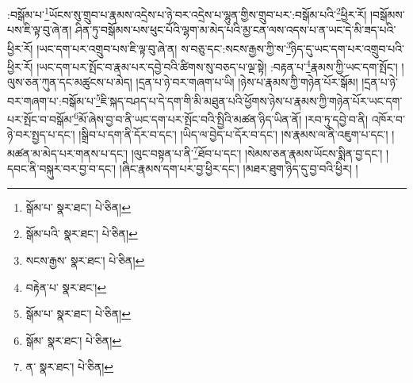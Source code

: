 :བསྒོམ་པ་\footnote{སྒོམ་པ་  སྣར་ཐང་།  པེ་ཅིན། }ཡོངས་སུ་གྲུབ་པ་རྣམས་འདྲེས་པ་ཉེ་བར་འདྲེས་པ་ལྷུན་གྱིས་གྲུབ་པར་:བསྒོམ་པའི་\footnote{སྒོམ་པའི་  སྣར་ཐང་།  པེ་ཅིན། }ཕྱིར་རོ། །བསྒོམས་པས་ཇི་ལྟ་བུ་ཞེ་ན། ཤིན་ཏུ་བསྒོམས་པས་ཕུང་པོའི་ལྷག་མ་མེད་པའི་མྱ་ངན་ལས་འདས་པ་ན་ཡང་དེ་མི་ཟད་པའི་ཕྱིར་རོ། །ཡང་དག་པར་འགྲུབ་པས་ཇི་ལྟ་བུ་ཞེ་ན། ས་བཅུ་དང་:སངས་རྒྱས་ཀྱི་ས་\footnote{སངས་རྒྱས་  སྣར་ཐང་།  པེ་ཅིན། }ཉིད་དུ་ཡང་དག་པར་འགྲུབ་པའི་ཕྱིར་རོ། །ཡང་དག་པར་སྤོང་བ་རྣམ་པར་དབྱེ་བའི་ཚིགས་སུ་བཅད་པ་ལྔ་སྟེ། :བརྟན་པ་\footnote{བརྟེན་པ་  སྣར་ཐང་། }རྣམས་ཀྱི་ཡང་དག་སྤོང་། །ལུས་ཅན་ཀུན་དང་མཚུངས་པ་མེད། །དྲན་པ་ཉེ་བར་གཞག་པ་ཡི། །ཉེས་པ་རྣམས་ཀྱི་གཉེན་པོར་སྒོམ། །དྲན་པ་ཉེ་བར་གཞག་པ་:བསྒོམ་པ་\footnote{སྒོམ་པ་  སྣར་ཐང་།  པེ་ཅིན། }ཇི་སྐད་བཤད་པ་དེ་དག་གི་མི་མཐུན་པའི་ཕྱོགས་ཉེས་པ་རྣམས་ཀྱི་གཉེན་པོར་ཡང་དག་པར་སྤོང་བ་བསྒོམ་\footnote{སྒོམ་  སྣར་ཐང་།  པེ་ཅིན། }མོ་ཞེས་བྱ་བ་ནི་ཡང་དག་པར་སྤོང་བའི་སྤྱིའི་མཚན་ཉིད་ཡིན་ནོ། །རབ་ཏུ་དབྱེ་བ་ནི། འཁོར་བ་ཉེ་བར་སྤྱད་པ་དང་། །སྒྲིབ་པ་དག་ནི་དོར་བ་དང་། །ཡིད་ལ་བྱེད་པ་དོར་བ་དང་། །ས་རྣམས་ལ་ནི་འཇུག་པ་དང་། །མཚན་མ་མེད་པར་གནས་པ་དང་། །ལུང་བསྟན་པ་ནི་\footnote{ན་  སྣར་ཐང་།  པེ་ཅིན། }ཐོབ་པ་དང་། །སེམས་ཅན་རྣམས་ཡོངས་སྨིན་བྱ་དང་། །དབང་ནི་བསྐུར་བར་བྱ་བ་དང་། །ཞིང་རྣམས་དག་པར་བྱ་ཕྱིར་དང་། །མཐར་ཐུག་ཉིད་དུ་བྱ་བའི་ཕྱིར། །
